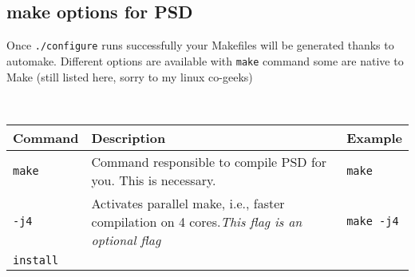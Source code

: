 \subsection{make options for PSD}

Once \lstinline!./configure! runs successfully your Makefiles will be
generated thanks to automake. Different options are available with
\lstinline!make! command some are native to Make (still listed here,
sorry to my linux co-geeks)

​

\begin{longtable}[]{@{}lll@{}}
\toprule
\begin{minipage}[b]{0.15\columnwidth}\raggedright\strut
\textbf{Command}\strut
\end{minipage} & \begin{minipage}[b]{0.47\columnwidth}\raggedright\strut
\textbf{Description}\strut
\end{minipage} & \begin{minipage}[b]{0.30\columnwidth}\raggedright\strut
\textbf{Example}\strut
\end{minipage}\tabularnewline
\midrule
\endhead
\begin{minipage}[t]{0.15\columnwidth}\raggedright\strut
\lstinline!make!\strut
\end{minipage} & \begin{minipage}[t]{0.47\columnwidth}\raggedright\strut
Command responsible to compile PSD for you. This is necessary.\strut
\end{minipage} & \begin{minipage}[t]{0.30\columnwidth}\raggedright\strut
\lstinline!make!\strut
\end{minipage}\tabularnewline
\begin{minipage}[t]{0.15\columnwidth}\raggedright\strut
\lstinline!-j4!\strut
\end{minipage} & \begin{minipage}[t]{0.47\columnwidth}\raggedright\strut
Activates parallel make, i.e., faster compilation on 4 cores.\emph{This
flag is an optional flag}\strut
\end{minipage} & \begin{minipage}[t]{0.30\columnwidth}\raggedright\strut
\lstinline!make -j4!\strut
\end{minipage}\tabularnewline
\begin{minipage}[t]{0.15\columnwidth}\raggedright\strut
\lstinline!install!\strut
\end{minipage} & \begin{minipage}[t]{0.47\columnwidth}\raggedright\strut

\end{minipage}
\end{longtable}
